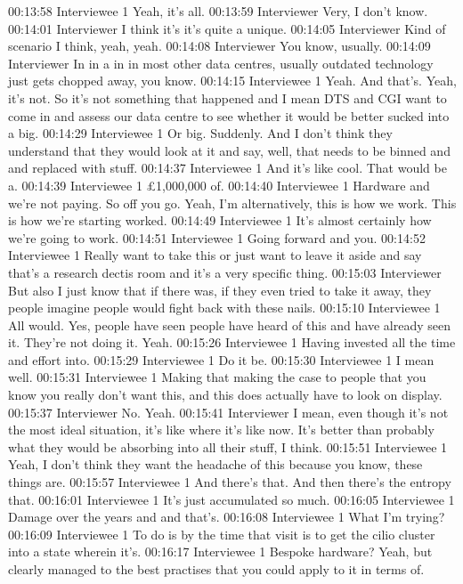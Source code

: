 00:13:58 Interviewee 1
Yeah, it's all.
00:13:59 Interviewer
Very, I don't know.
00:14:01 Interviewer
I think it's it's quite a unique.
00:14:05 Interviewer
Kind of scenario I think, yeah, yeah.
00:14:08 Interviewer
You know, usually.
00:14:09 Interviewer
In in a in in most other data centres, usually outdated technology just gets chopped away, you know.
00:14:15 Interviewee 1
Yeah. And that's. Yeah, it's not. So it's not something that happened and I mean DTS and CGI want to come in and assess our data centre to see whether it would be better sucked into a big.
00:14:29 Interviewee 1
Or big. Suddenly. And I don't think they understand that they would look at it and say, well, that needs to be binned and and replaced with stuff.
00:14:37 Interviewee 1
And it's like cool. That would be a.
00:14:39 Interviewee 1
£1,000,000 of.
00:14:40 Interviewee 1
Hardware and we're not paying. So off you go. Yeah, I'm alternatively, this is how we work. This is how we're starting worked.
00:14:49 Interviewee 1
It's almost certainly how we're going to work.
00:14:51 Interviewee 1
Going forward and you.
00:14:52 Interviewee 1
Really want to take this or just want to leave it aside and say that's a research dectis room and it's a very specific thing.
00:15:03 Interviewer
But also I just know that if there was, if they even tried to take it away, they people imagine people would fight back with these nails.
00:15:10 Interviewee 1
All would. Yes, people have seen people have heard of this and have already seen it. They're not doing it. Yeah.
00:15:26 Interviewee 1
Having invested all the time and effort into.
00:15:29 Interviewee 1
Do it be.
00:15:30 Interviewee 1
I mean well.
00:15:31 Interviewee 1
Making that making the case to people that you know you really don't want this, and this does actually have to look on display.
00:15:37 Interviewer
No. Yeah.
00:15:41 Interviewer
I mean, even though it's not the most ideal situation, it's like where it's like now. It's better than probably what they would be absorbing into all their stuff, I think.
00:15:51 Interviewee 1
Yeah, I don't think they want the headache of this because you know, these things are.
00:15:57 Interviewee 1
And there's that. And then there's the entropy that.
00:16:01 Interviewee 1
It's just accumulated so much.
00:16:05 Interviewee 1
Damage over the years and and that's.
00:16:08 Interviewee 1
What I'm trying?
00:16:09 Interviewee 1
To do is by the time that visit is to get the cilio cluster into a state wherein it's.
00:16:17 Interviewee 1
Bespoke hardware? Yeah, but clearly managed to the best practises that you could apply to it in terms of.
